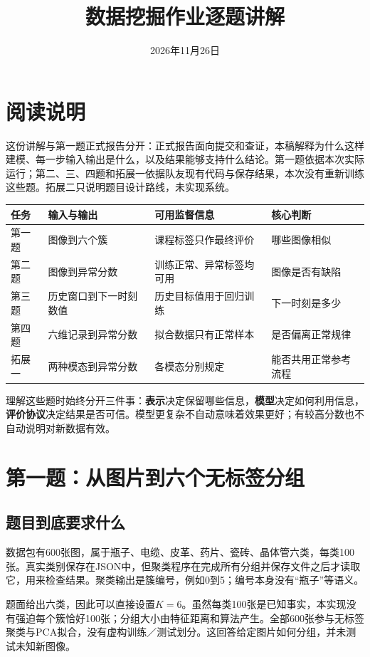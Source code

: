 \documentclass[UTF8,fontset=windows,11pt,a4paper]{ctexart}
\title{数据挖掘作业逐题讲解}
\author{}
\date{2026年11月26日}
\begin{document}
\maketitle
\tableofcontents
\newpage

\section*{阅读说明}
这份讲解与第一题正式报告分开：正式报告面向提交和查证，本稿解释为什么这样建模、每一步输入输出是什么，以及结果能够支持什么结论。第一题依据本次实际运行；第二、三、四题和拓展一依据队友现有代码与保存结果，本次没有重新训练这些题。拓展二只说明题目设计路线，未实现系统。

\begin{center}\small
\begin{tabularx}{\linewidth}{lXXX}\toprule
任务 & 输入与输出 & 可用监督信息 & 核心判断\\\midrule
第一题 & 图像到六个簇 & 课程标签只作最终评价 & 哪些图像相似\\
第二题 & 图像到异常分数 & 训练正常、异常标签均可用 & 图像是否有缺陷\\
第三题 & 历史窗口到下一时刻数值 & 历史目标值用于回归训练 & 下一时刻是多少\\
第四题 & 六维记录到异常分数 & 拟合数据只有正常样本 & 是否偏离正常规律\\
拓展一 & 两种模态到异常分数 & 各模态分别规定 & 能否共用正常参考流程\\\bottomrule
\end{tabularx}\end{center}

理解这些题时始终分开三件事：\textbf{表示}决定保留哪些信息，\textbf{模型}决定如何利用信息，\textbf{评价协议}决定结果是否可信。模型更复杂不自动意味着效果更好；有较高分数也不自动说明对新数据有效。

\section{第一题：从图片到六个无标签分组}
\subsection{题目到底要求什么}
数据包有600张图，属于瓶子、电缆、皮革、药片、瓷砖、晶体管六类，每类100张。真实类别保存在JSON中，但聚类程序在完成所有分组并保存文件之后才读取它，用来检查结果。聚类输出是簇编号，例如0到5；编号本身没有“瓶子”等语义。

题面给出六类，因此可以直接设置$K=6$。虽然每类100张是已知事实，本实现没有强迫每个簇恰好100张；分组大小由特征距离和算法产生。全部600张参与无标签聚类与PCA拟合，没有虚构训练／测试划分。这回答给定图片如何分组，并未测试未知新图像。
\end{document}
